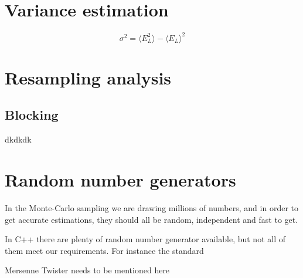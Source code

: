 \section{Variance estimation}
\begin{equation}
\sigma^2=\langle E_L^2\rangle - \langle E_L\rangle^2
\end{equation}

\section{Resampling analysis} \label{sec:resampling}
\subsection{Blocking}
dkdkdk



\section{Random number generators} \label{sec:RNG}
In the Monte-Carlo sampling we are drawing millions of numbers, and in order to get accurate estimations, they should all be random, independent and fast to get. 

In C++ there are plenty of random number generator available, but not all of them meet our requirements. For instance the standard 

Mersenne Twister needs to be mentioned here